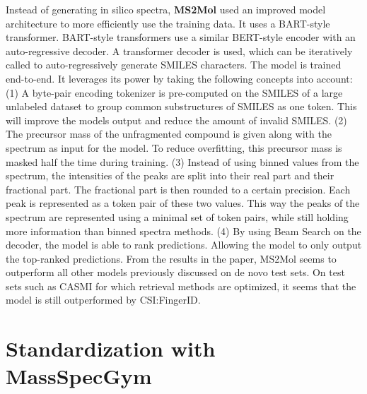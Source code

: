 Instead of generating in silico spectra, \textbf{MS2Mol} \cite{butler2023ms2mol} used an improved model architecture to more efficiently use the training data. It uses a BART-style \cite{lewis2019bart} transformer. BART-style transformers use a similar BERT-style encoder with an auto-regressive decoder.
A transformer decoder is used, which can be iteratively called to auto-regressively generate SMILES characters. The model is trained end-to-end. It leverages its power by taking the following concepts into account: 
(1) A byte-pair encoding tokenizer is pre-computed on the SMILES of a large unlabeled dataset to group common substructures of SMILES as one token. This will improve the models output and reduce the amount of invalid SMILES.
(2) The precursor mass of the unfragmented compound is given along with the spectrum as input for the model. To reduce overfitting, this precursor mass is masked half the time during training.
(3) Instead of using binned values from the spectrum, the intensities of the peaks are split into their real part and their fractional part. The fractional part is then rounded to a certain precision. Each peak is represented as a token pair of these two values. This way the peaks of the spectrum are represented using a minimal set of token pairs, while still holding more information than binned spectra methods. 
(4) By using Beam Search on the decoder, the model is able to rank predictions. Allowing the model to only output the top-ranked predictions.
From the results in the paper, MS2Mol seems to outperform all other models previously discussed on de novo test sets. On test sets such as CASMI \cite{schymanski2017critical} for which retrieval methods are optimized, it seems that the model is still outperformed by CSI:FingerID.

\section{Standardization with MassSpecGym}
\label{sec:massspecgym}

